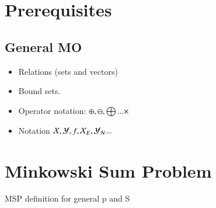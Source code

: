 

\section{Prerequisites}

\subsection{General MO}
\begin{itemize}
	\item Relations (sets and vectors)
	\item Bound sets.
	\item Operator notation: $\oplus , \ominus , \bigoplus... \times$
	\item Notation $\mathcal{X}, \mathcal{Y}, f, \mathcal{X}_E, \mathcal{Y}_{\mathcal{N}}...$
\end{itemize}


\section{Minkowski Sum Problem}
MSP definition for general p and S


